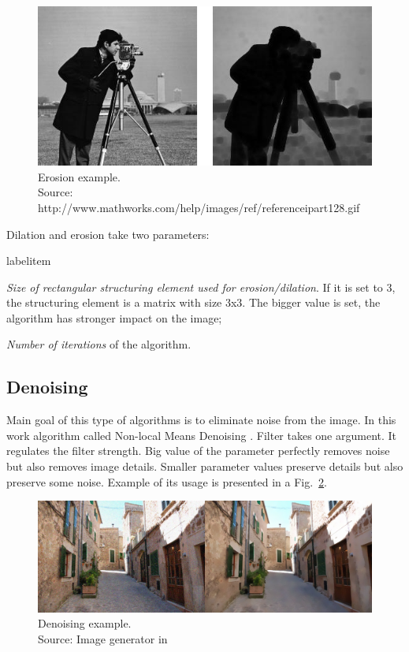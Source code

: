 \documentclass[a4paper,onecolumn,oneside,12pt]{memoir}
\makeatletter
\renewenvironment{itemize}{
  \begin{list}{  
  \csname labelitem\romannumeral\the\@listdepth\endcsname}{
  \setlength{\leftmargin}{1em}
	\setlength{\topsep}{6pt}%
	\setlength{\partopsep}{0pt}%
	\setlength{\parskip}{0pt}%
	\setlength{\parsep}{0pt}%
	\setlength{\itemsep}{0pt}}
}{
  \end{list}
}
\makeatother
\begin{document}
\begin{figure}[ht]
\begin{center}
\includegraphics[scale=0.6]{images/erosionExample.jpg}
\caption{Erosion example. \\
Source: http://www.mathworks.com/help/images/ref/referenceipart128.gif}
\label{erosionExample}
\end{center}
\end{figure}

Dilation and erosion take two parameters:

\begin{itemize}
  \item \textit{Size of rectangular structuring element used for erosion/dilation}. If it is set to
        3, the structuring element is a matrix with size 3x3. The bigger value is set, the algorithm
        has stronger impact on the image;
  \item \textit{Number of iterations} of the algorithm.
\end{itemize}

\subsection{Denoising}

Main goal of this type of algorithms is to eliminate noise from the image. In this work algorithm
called Non-local Means Denoising \cite{nonLocalMeansDenoising}. Filter takes one argument. It
regulates the filter strength. Big value of the parameter perfectly removes noise but also removes
image details. Smaller parameter values preserve details but also preserve some noise.
Example of its usage is presented in a Fig.~\ref{denoisingExample}.

\begin{figure}[ht]
\begin{center}
\includegraphics[scale=0.3]{images/denoisingExample.jpg}
\caption{Denoising example. \\
Source: Image generator in \cite{nonLocalMeansDenoising}}
\label{denoisingExample}
\end{center}
\end{figure}
\end{document}
